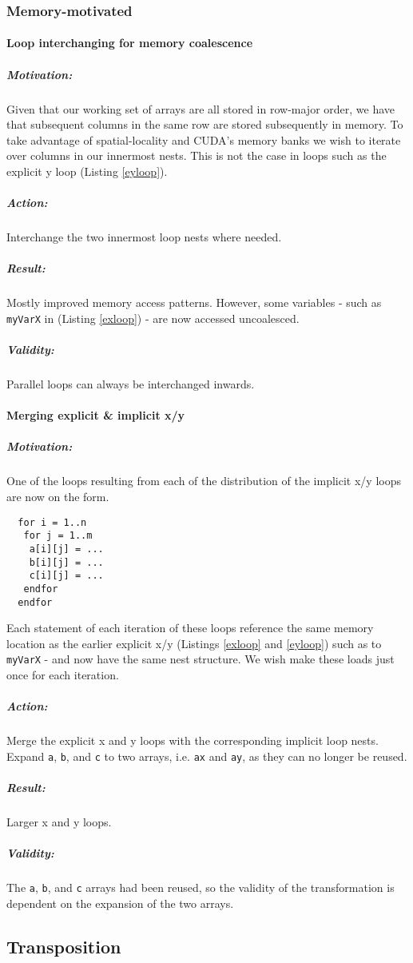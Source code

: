 \subsubsection{Memory-motivated}

\paragraph{Loop interchanging for memory coalescence}
\subparagraph{Motivation:} Given that our working set of arrays are all stored in row-major order, we have that subsequent columns in the
 same row are stored subsequently in memory. To take advantage of spatial-locality and CUDA's memory banks we wish to iterate over columns
 in our innermost nests. This is not the case in loops such as the explicit y loop (Listing \ref{eyloop}).
\subparagraph{Action:} Interchange the two innermost loop nests where needed.
\subparagraph{Result:} Mostly improved memory access patterns. However, some variables - such as \verb!myVarX! in (Listing \ref{exloop}) -
 are now accessed uncoalesced.
\subparagraph{Validity:} Parallel loops can always be interchanged inwards.
\paragraph{Merging explicit \& implicit x/y}
\subparagraph{Motivation:} One of the loops resulting from each of the distribution of the implicit x/y loops are now on the form.
\begin{lstlisting}
  for i = 1..n
   for j = 1..m
    a[i][j] = ...
    b[i][j] = ...
    c[i][j] = ...
   endfor
  endfor
\end{lstlisting}
 Each statement of each iteration of these loops reference the same memory location as the earlier explicit x/y
 (Listings \ref{exloop} and \ref{eyloop}) such as to \verb!myVarX! - and now have the same nest structure. We wish make these loads just
 once for each iteration.
\subparagraph{Action:} Merge the explicit x and y loops with the corresponding implicit loop nests. Expand \verb!a!, \verb!b!, and \verb!c!
 to two arrays, i.e. \verb!ax! and \verb!ay!, as they can no longer be reused.
\subparagraph{Result:} Larger x and y loops.
\subparagraph{Validity:} The \verb!a!, \verb!b!, and \verb!c! arrays had been reused, so the validity of the transformation is dependent on
 the expansion of the two arrays.
\subsection{Transposition}

